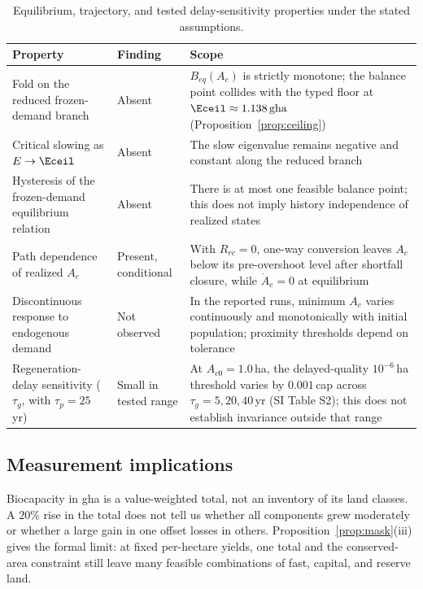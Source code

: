 \begin{table}[!htbp]
\centering\footnotesize
\caption{Equilibrium, trajectory, and tested delay-sensitivity properties under the stated assumptions.}
\label{tab:neg}
\begin{tabularx}{\textwidth}{>{\raggedright\arraybackslash}p{} l >{\raggedright\arraybackslash}X}
\toprule
Property & Finding & Scope \\
\midrule
Fold on the reduced frozen-demand branch & Absent & $B_{eq}(A_c)$ is strictly monotone; the balance point collides with the typed floor at $\Eceil\approx1.138\,\mathrm{gha}$ (Proposition~\ref{prop:ceiling}) \\
Critical slowing as $E\to\Eceil$ & Absent & The slow eigenvalue remains negative and constant along the reduced branch \\
Hysteresis of the frozen-demand equilibrium relation & Absent & There is at most one feasible balance point; this does not imply history independence of realized states \\
Path dependence of realized $A_c$ & Present, conditional & With $R_{rc}=0$, one-way conversion leaves $A_c$ below its pre-overshoot level after shortfall closure, while $\dot A_c=0$ at equilibrium \\
Discontinuous response to endogenous demand & Not observed & In the reported runs, minimum $A_c$ varies continuously and monotonically with initial population; proximity thresholds depend on tolerance \\
Regeneration-delay sensitivity ($\tau_g$, with $\tau_p=25$\,yr) & Small in tested range & At $A_{c0}=1.0$\,ha, the delayed-quality $10^{-6}$\,ha threshold varies by $0.001$\,cap across $\tau_g=5,20,40$\,yr (SI Table S2); this does not establish invariance outside that range \\
\bottomrule
\end{tabularx}
\end{table}
\clearpage

\subsection{Measurement implications}

Biocapacity in gha is a value-weighted total, not an inventory of its land classes. A $20\%$ rise in the total does not tell us whether all components grew moderately or whether a large gain in one offset losses in others. Proposition~\ref{prop:mask}(iii) gives the formal limit: at fixed per-hectare yields, one total and the conserved-area constraint still leave many feasible combinations of fast, capital, and reserve land.

